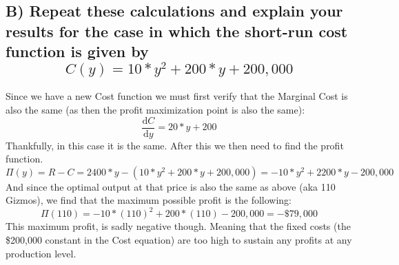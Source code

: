 \documentclass{article}
\begin{document}
\subsection{B) Repeat these calculations and explain your results for the case in which the short-run cost function is given by $$ C(y) = 10*y^2 + 200*y + 200,000 $$}
Since we have a new Cost function we must first verify that the Marginal Cost is also the same (as then the profit maximization point is also the same):
$$ \frac{\text{d}C}{\text{d}y} = 20*y + 200 $$
Thankfully, in this case it is the same. After this we then need to find the profit function.
$$ \Pi(y) = R - C = 2400*y - (10*y^2 + 200*y + 200,000)  = -10*y^2 + 2200*y - 200,000$$
And since the optimal output at that price is also the same as above (aka 110 Gizmos), we find that the maximum possible profit is the following:
$$ \Pi(110) = -10*(110)^2 + 200*(110) - 200,000 = -\$79,000 $$
This maximum profit, is sadly negative though. Meaning that the fixed costs (the \$200,000 constant in the Cost equation) are too high to sustain any profits at any production level.
\end{document}
